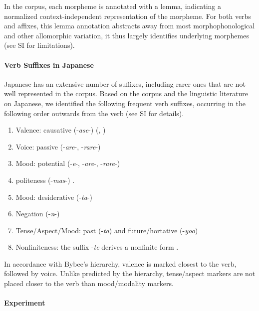 In the corpus, each morpheme is annotated with a lemma, indicating a normalized context-independent representation of the morpheme.
For both verbs and affixes, this lemma annotation abstracts away from most morphophonological and other allomorphic variation, it thus largely identifies underlying morphemes (see SI for limitations).


\paragraph{Verb Suffixes in Japanese}

Japanese has an extensive number of suffixes, including rarer ones that are not well represented in the corpus.
Based on the corpus and the linguistic literature on Japanese, we identified the following frequent verb suffixes, occurring in the following order outwards from the verb (see SI for details).


\begin{enumerate}
\item Valence: causative (-\textit{ase}-) (\citet[142]{hasegawa2014japanese}, \citet[Chapter 13]{kaiser2013japanese})
\item Voice: passive (-\textit{are}-, -\textit{rare}-) \cite[152]{hasegawa2014japanese} \cite[Chapter 12]{kaiser2013japanese}
\item Mood: potential (-\textit{e}-, -\textit{are}-, -\textit{rare}-)  
\item politeness (-\textit{mas}-) \cite[190]{kaiser2013japanese}.
\item Mood: desiderative (-\textit{ta}-) \cite[238]{kaiser2013japanese}
\item Negation (-\textit{n}-)
\item Tense/Aspect/Mood: past (-\textit{ta}) and future/hortative (-\textit{yoo}) \cite[229]{kaiser2013japanese}
\item Nonfiniteness: the suffix -\textit{te} derives a nonfinite form \cite[186]{kaiser2013japanese}.
\end{enumerate}

In accordance with Bybee's hierarchy, valence is marked closest to the verb, followed by voice.
Unlike predicted by the hierarchy, tense/aspect markers are not placed closer to the verb than mood/modality markers.



\paragraph{Experiment}

